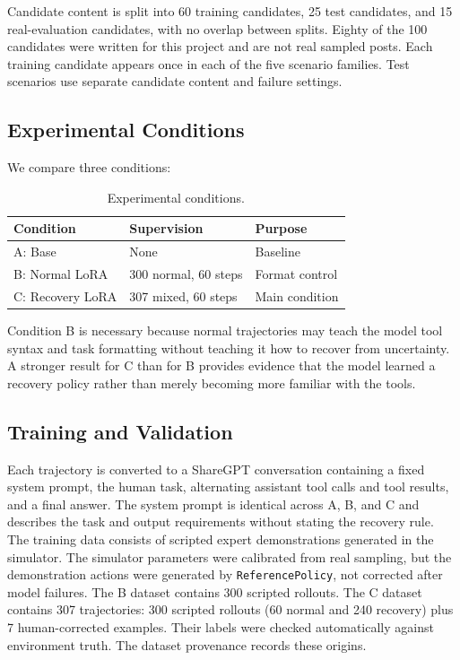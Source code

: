 \documentclass[11pt]{article}
\begin{document}
Candidate content is split into 60 training candidates, 25 test candidates, and 15 real-evaluation candidates, with no overlap between splits. Eighty of the 100 candidates were written for this project and are not real sampled posts. Each training candidate appears once in each of the five scenario families. Test scenarios use separate candidate content and failure settings.

\subsection{Experimental Conditions}

We compare three conditions:

\begin{table}[H]
\centering
\small
\begin{tabular}{@{}lll@{}}
\toprule
Condition & Supervision & Purpose\\
\midrule
A: Base & None & Baseline\\
B: Normal LoRA & 300 normal, 60 steps & Format control\\
C: Recovery LoRA & 307 mixed, 60 steps & Main condition\\
\bottomrule
\end{tabular}
\caption{Experimental conditions.}
\label{tab:conditions}
\end{table}

Condition B is necessary because normal trajectories may teach the model tool syntax and task formatting without teaching it how to recover from uncertainty. A stronger result for C than for B provides evidence that the model learned a recovery policy rather than merely becoming more familiar with the tools.

\subsection{Training and Validation}

Each trajectory is converted to a ShareGPT conversation containing a fixed system prompt, the human task, alternating assistant tool calls and tool results, and a final answer. The system prompt is identical across A, B, and C and describes the task and output requirements without stating the recovery rule. The training data consists of scripted expert demonstrations generated in the simulator. The simulator parameters were calibrated from real sampling, but the demonstration actions were generated by \texttt{ReferencePolicy}, not corrected after model failures. The B dataset contains 300 scripted rollouts. The C dataset contains 307 trajectories: 300 scripted rollouts (60 normal and 240 recovery) plus 7 human-corrected examples. Their labels were checked automatically against environment truth. The dataset provenance records these origins.
\end{document}
